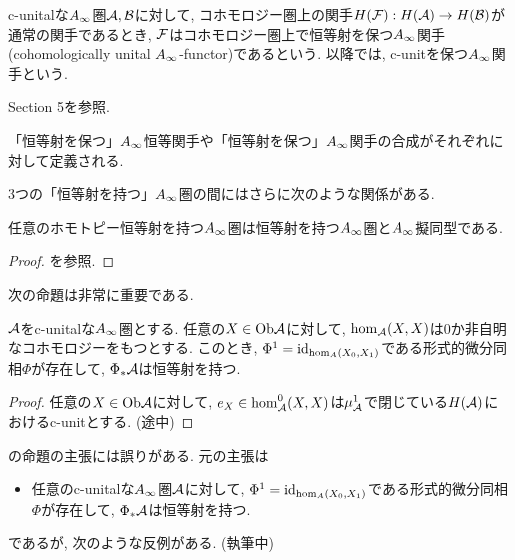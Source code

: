 \documentclass[uplatex, a4paper, 14Q, dvipdfmx]{jsarticle}
\begin{document}
\begin{definition}
  c-unitalな$A_{\infty}$圏$\mathcal{A},\mathcal{B}$に対して, コホモロジー圏上の関手$H(\mathcal{F}): H(\mathcal{A}) \to H(\mathcal{B})$が通常の関手であるとき, $\mathcal{F}$はコホモロジー圏上で恒等射を保つ$A_{\infty}$関手(cohomologically unital $A_{\infty}$-functor)であるという. 
  以降では, c-unitを保つ$A_{\infty}$関手という. 
\end{definition}

\begin{definition}
  \cite{Fuk02} Section 5を参照.
\end{definition}

「恒等射を保つ」$A_{\infty}$恒等関手や「恒等射を保つ」$A_{\infty}$関手の合成がそれぞれに対して定義される.

3つの「恒等射を持つ」$A_{\infty}$圏の間にはさらに次のような関係がある. 

\begin{lemma}
  任意のホモトピー恒等射を持つ$A_{\infty}$圏は恒等射を持つ$A_{\infty}$圏と$A_{\infty}$擬同型である. 
\end{lemma}

\begin{proof}
  \cite{Fuk02}を参照.
\end{proof}

次の命題は非常に重要である.

\begin{lemma} \label{prop_PhiA_is_strictly_unital}
  $\mathcal{A}$をc-unitalな$A_{\infty}$圏とする. 
  任意の$X \in \mathrm{Ob}\mathcal{A}$に対して, $\hom_{\mathcal{A}}(X,X)$は$0$か非自明なコホモロジーをもつとする. 
  このとき, $\Phi^1=\mathrm{id}_{\hom_A(X_0,X_1)}$である形式的微分同相$\Phi$が存在して, $\Phi_\ast \mathcal{A}$は恒等射を持つ. 
\end{lemma}

\begin{proof}
  任意の$X \in \mathrm{Ob}\mathcal{A}$に対して, $e_X \in \hom_{\mathcal{A}}^0(X,X)$は$\mu_{\mathcal{A}}^1$で閉じている$H(\mathcal{A})$におけるc-unitとする. (途中)
\end{proof}

\begin{remark}
  \cite{Sei}の命題の主張には誤りがある. 
  元の主張は
  \begin{itemize}
    \item 任意のc-unitalな$A_{\infty}$圏$\mathcal{A}$に対して, $\Phi^1=\mathrm{id}_{\hom_A(X_0,X_1)}$である形式的微分同相$\Phi$が存在して, $\Phi_\ast \mathcal{A}$は恒等射を持つ. 
  \end{itemize}
  であるが, 次のような反例がある. (執筆中)
\end{remark}
\end{document}
